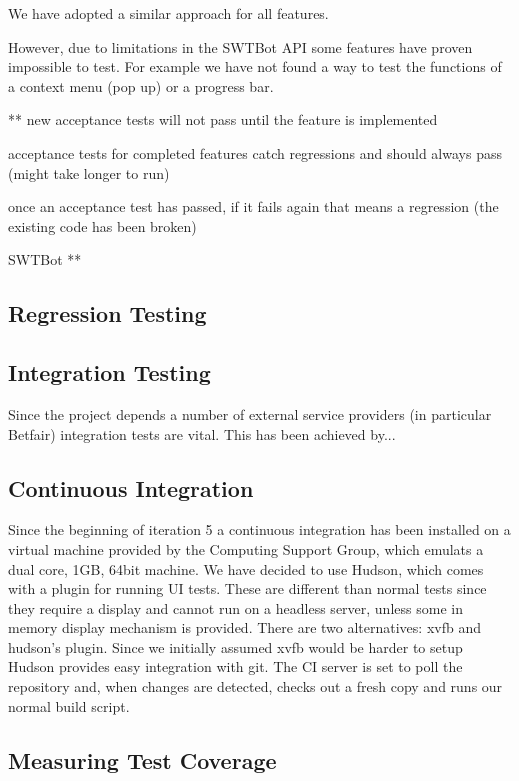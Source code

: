 \documentclass[10pt]{article}
\begin{document}
We have adopted a similar approach for all features.

However, due to limitations in the SWTBot API some features have proven impossible to test. For example we have not found a way to test the functions of a context menu (pop up) or a progress bar.

** new acceptance tests will not pass until the feature is implemented

acceptance tests for completed features catch regressions and should always pass (might take
longer to run)

once an acceptance test has passed, if it fails again that means a regression (the existing code has been broken)

SWTBot **

\subsection{Regression Testing}


\subsection{Integration Testing}
Since the project depends a number of external service providers (in particular Betfair) integration tests are vital. This has been achieved by...

\subsection{Continuous Integration}

Since the beginning of iteration 5 a continuous integration has been installed on a virtual machine provided by the Computing Support Group, which emulats a dual core, 1GB, 64bit machine.
We have decided to use Hudson, which comes with a plugin for running UI tests. These are different than normal tests since they require a display and cannot run on a headless server, unless some in memory display mechanism is provided. There are two alternatives: xvfb and hudson's plugin. Since we initially assumed xvfb would be harder to setup
Hudson provides easy integration with git.
The CI server is set to poll the repository and, when changes are detected, checks out a fresh copy and runs our normal build script.

\subsection{Measuring Test Coverage}
\end{document}
